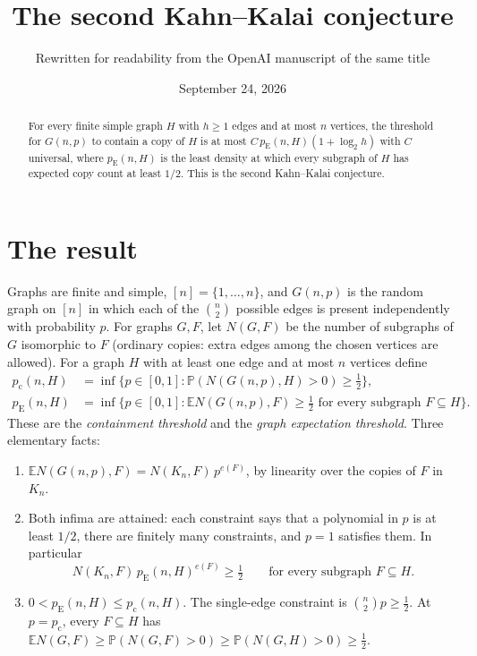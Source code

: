 \documentclass[11pt]{article}
\title{The second Kahn--Kalai conjecture}
\author{Rewritten for readability from the OpenAI manuscript of the same title}
\date{September 24, 2026}
\numberwithin{equation}{section}
\newcommand{\PP}{\mathbb P}
\newcommand{\EE}{\mathbb E}
\newcommand{\pc}{p_{\mathrm c}}
\newcommand{\pE}{p_{\mathrm E}}
\begin{document}
\maketitle
\begin{abstract}
For every finite simple graph $H$ with $h\ge1$ edges and at most $n$ vertices,
the threshold for $G(n,p)$ to contain a copy of $H$ is at most
$C\,\pE(n,H)(1+\log_2 h)$ with $C$ universal, where $\pE(n,H)$ is the least
density at which every subgraph of $H$ has expected copy count at least $1/2$.
This is the second Kahn--Kalai conjecture.
\end{abstract}

\section{The result}\label{sec:introduction}

Graphs are finite and simple, $[n]=\{1,\ldots,n\}$, and $G(n,p)$ is the random
graph on $[n]$ in which each of the $\binom n2$ possible edges is present
independently with probability $p$. For graphs $G,F$, let $N(G,F)$ be the
number of subgraphs of $G$ isomorphic to $F$ (ordinary copies: extra edges
among the chosen vertices are allowed). For a graph $H$ with at least one edge
and at most $n$ vertices define
\begin{align*}
 \pc(n,H)&=\inf\{p\in[0,1]:\PP(N(G(n,p),H)>0)\ge\tfrac12\},\\
 \pE(n,H)&=\inf\{p\in[0,1]:\EE N(G(n,p),F)\ge\tfrac12
                 \text{ for every subgraph }F\subseteq H\}.
\end{align*}
These are the \emph{containment threshold} and the \emph{graph expectation
threshold}. Three elementary facts:
\begin{enumerate}[label=(\alph*),leftmargin=2em,itemsep=1pt]
\item $\EE N(G(n,p),F)=N(K_n,F)\,p^{e(F)}$, by linearity over the copies of $F$
in $K_n$.
\item Both infima are attained: each constraint says that a polynomial in $p$
is at least $1/2$, there are finitely many constraints, and $p=1$ satisfies
them. In particular
\begin{equation}\label{eq:attained}
 N(K_n,F)\,\pE(n,H)^{e(F)}\ge\tfrac12\qquad\text{for every subgraph }F\subseteq H.
\end{equation}
\item $0<\pE(n,H)\le\pc(n,H)$. The single-edge constraint is $\binom n2p\ge\frac12$.
At $p=\pc$, every $F\subseteq H$ has
$\EE N(G,F)\ge\PP(N(G,F)>0)\ge\PP(N(G,H)>0)\ge\frac12$.
\end{enumerate}
\end{document}
